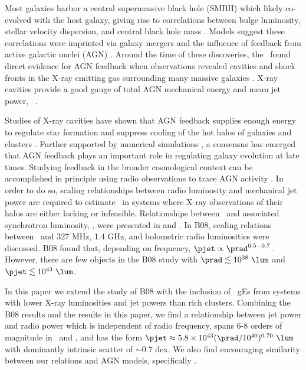 \documentclass[12pt, preprint]{aastex}
\begin{document}
Most galaxies harbor a central supermassive black hole (SMBH) which
likely co-evolved with the host galaxy, giving rise to correlations
between bulge luminosity, stellar velocity dispersion, and central
black hole mass \citep{1995ARA&A..33..581K, magorrian}. Models suggest
these correlations were imprinted via galaxy mergers and the influence
of feedback from active galactic nuclei (AGN)
\citep[\eg][]{1998A&A...331L...1S, 2000MNRAS.311..576K}. Around the
time of these discoveries, the \cxo\ found direct evidence for AGN
feedback when observations revealed cavities and shock fronts in the
X-ray emitting gas surrounding many massive galaxies
\citep[\eg][]{2000ApJ...534L.135M, perseus1, 2007ApJ...665.1057F}.
X-ray cavities provide a good gauge of total AGN mechanical energy and
mean jet power, \pjet\ \citep{2000ApJ...534L.135M,
  2001ApJ...554..261C, mcnamrev}.

Studies of X-ray cavities have shown that AGN feedback supplies enough
energy to regulate star formation and suppress cooling of the hot
halos of galaxies and clusters \citep{birzan04, 2005MNRAS.364.1343D,
  rafferty06}. Further supported by numerical simulations
\citep[\eg][]{croton06, bower06}, a consensus has emerged that AGN
feedback plays an important role in regulating galaxy evolution at
late times. Studying feedback in the broader cosmological context can
be accomplished in principle using radio observations to trace AGN
activity \citep[\eg][]{best07}. In order to do so, scaling
relationships between radio luminosity and mechanical jet power are
required to estimate \pjet\ in systems where X-ray observations of
their halos are either lacking or infeasible. Relationships between
\pjet\ and associated synchrotron luminosity, \prad, were presented in
\citet[][hereafter B04]{birzan04} and \citet[][hereafter
  B08]{birzan08}. In B08, scaling relations between \pjet\ and 327
MHz, 1.4 GHz, and bolometric radio luminosities were discussed. B08
found that, depending on frequency, $\pjet \propto
\prad^{0.5-0.7}$. However, there are few objects in the B08 study with
$\prad \lesssim 10^{38} ~\lum$ and $\pjet \lesssim 10^{43} ~\lum$.

In this paper we extend the study of B08 with the inclusion of
\samp\ gEs from systems with lower X-ray luminosities and jet powers
than rich clusters. Combining the B08 results and the results in this
paper, we find a relationship between jet power and radio power which
is independent of radio frequency, spans 6-8 orders of magnitude in
\pjet\ and \prad, and has the form $\pjet \approx 5.8 \times 10^{43}
(\prad/10^{40})^{0.70} ~\lum$ with dominantly intrinsic scatter of
$\sim 0.7$ dex. We also find encouraging similarity between our
relations and AGN models, specifically \citet{w99}.
\end{document}
